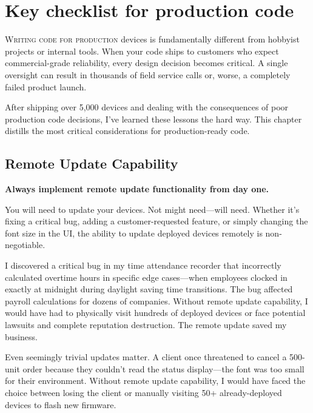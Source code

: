 \chapter{Key checklist for production code}

\lettrine{W}{riting code for production} devices is fundamentally different from hobbyist projects or internal tools. When your code ships to customers who expect commercial-grade reliability, every design decision becomes critical. A single oversight can result in thousands of field service calls or, worse, a completely failed product launch.

After shipping over 5,000 devices and dealing with the consequences of poor production code decisions, I've learned these lessons the hard way. This chapter distills the most critical considerations for production-ready code.

\section{Remote Update Capability}

\textbf{Always implement remote update functionality from day one.}

You will need to update your devices. Not might need—will need. Whether it's fixing a critical bug, adding a customer-requested feature, or simply changing the font size in the UI, the ability to update deployed devices remotely is non-negotiable.

\begin{tcolorbox}[colback=red!10,colframe=red!75!black,title=Real Crisis: Time Calculation Bug]
I discovered a critical bug in my time attendance recorder that incorrectly calculated overtime hours in specific edge cases—when employees clocked in exactly at midnight during daylight saving time transitions. The bug affected payroll calculations for dozens of companies. Without remote update capability, I would have had to physically visit hundreds of deployed devices or face potential lawsuits and complete reputation destruction. The remote update saved my business.
\end{tcolorbox}

\begin{tcolorbox}[colback=blue!10,colframe=blue!75!black,title=Minor Issues Add Up]
Even seemingly trivial updates matter. A client once threatened to cancel a 500-unit order because they couldn't read the status display—the font was too small for their environment. Without remote update capability, I would have faced the choice between losing the client or manually visiting 50+ already-deployed devices to flash new firmware.
\end{tcolorbox}

